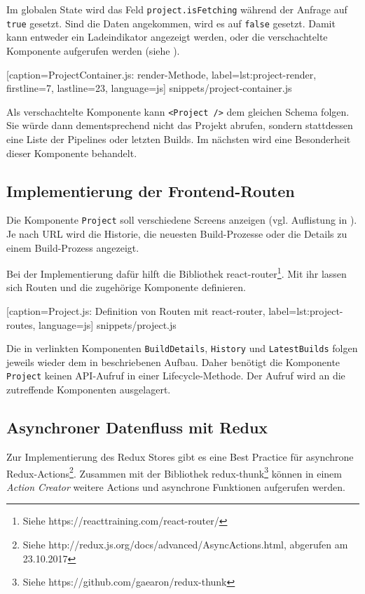 Im globalen State wird das Feld \texttt{project.isFetching} während der Anfrage auf \texttt{true} gesetzt. Sind die Daten angekommen, wird es auf \texttt{false} gesetzt. Damit kann entweder ein Ladeindikator angezeigt werden, oder die verschachtelte Komponente aufgerufen werden (siehe ).


  [caption={ProjectContainer.js: render-Methode},
  label={lst:project-render},
  firstline=7,
  lastline=23,
  language=js]
  {snippets/project-container.js}

Als verschachtelte Komponente kann \texttt{<Project />} dem gleichen Schema folgen. Sie würde dann  dementsprechend nicht das Projekt abrufen, sondern stattdessen eine Liste der Pipelines oder letzten Builds. Im nächsten  wird eine Besonderheit dieser Komponente behandelt.

\subsection{Implementierung der Frontend-Routen}
\label{subsec:react-routes}

Die Komponente \texttt{Project} soll verschiedene Screens anzeigen (vgl. Auflistung in ). Je nach \acs{URL} wird die Historie, die neuesten Build-Prozesse oder die Details zu einem Build-Prozess angezeigt.

Bei der Implementierung dafür hilft die Bibliothek react-router\footnote{Siehe https://reacttraining.com/react-router/}. Mit ihr lassen sich Routen und die zugehörige Komponente definieren.


  [caption={Project.js: Definition von Routen mit react-router},
  label={lst:project-routes},
  language=js]
  {snippets/project.js}

Die in  verlinkten Komponenten \texttt{BuildDetails}, \texttt{History} und \texttt{Latest\-Builds} folgen jeweils wieder dem in  beschriebenen Aufbau. Daher benötigt die Komponente \texttt{Project} keinen API-Aufruf in einer Lifecycle-Methode. Der Aufruf wird an die zutreffende Komponenten ausgelagert.

\subsection{Asynchroner Datenfluss mit Redux}

Zur Implementierung des Redux Stores gibt es eine Best Practice für asynchrone Redux-Actions\footnote{Siehe http://redux.js.org/docs/advanced/AsyncActions.html, abgerufen am 23.10.2017}. Zusammen mit der Bibliothek redux-thunk\footnote{Siehe https://github.com/gaearon/redux-thunk} können in einem \emph{Action Creator} weitere Actions und asynchrone Funktionen aufgerufen werden.

